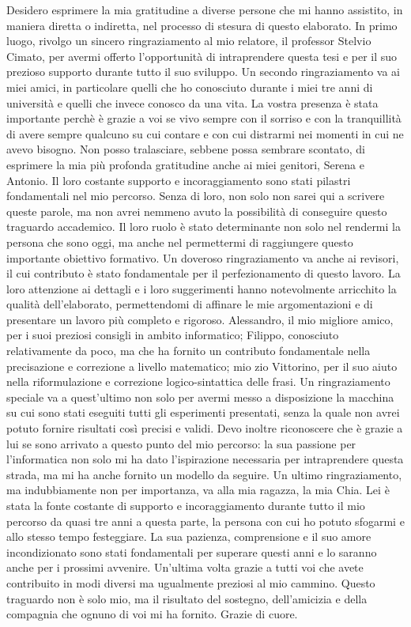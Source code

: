 Desidero esprimere la mia gratitudine a diverse persone che mi hanno assistito, in maniera
diretta o indiretta, nel processo di stesura di questo elaborato.  
In primo luogo, rivolgo un sincero ringraziamento al mio relatore, il professor 
Stelvio Cimato, per avermi offerto l'opportunità di intraprendere questa tesi e per 
il suo prezioso supporto durante tutto il suo sviluppo. Un secondo ringraziamento va ai 
miei amici, in particolare quelli che ho conosciuto durante i miei tre anni di università
e quelli che invece conosco da una vita. La vostra presenza è stata importante perchè è 
grazie a voi se vivo sempre con il sorriso e con la tranquillità di avere sempre qualcuno 
su cui contare e con cui distrarmi nei momenti in cui ne avevo bisogno. 
Non posso tralasciare, sebbene possa sembrare scontato, di esprimere la mia più profonda 
gratitudine anche ai miei genitori, Serena e Antonio. Il loro costante supporto e incoraggiamento sono stati 
pilastri fondamentali nel mio percorso. Senza di loro, non solo non sarei qui a 
scrivere queste parole, ma non avrei nemmeno avuto la possibilità di conseguire 
questo traguardo accademico. Il loro ruolo è stato determinante non solo nel rendermi 
la persona che sono oggi, ma anche nel permettermi di raggiungere questo importante 
obiettivo formativo.
Un doveroso ringraziamento va anche ai revisori, il cui contributo è stato fondamentale
per il perfezionamento di questo lavoro. La loro attenzione ai dettagli e
i loro suggerimenti hanno notevolmente arricchito la qualità
dell'elaborato, permettendomi di affinare le mie argomentazioni e di presentare un
lavoro più completo e rigoroso. Alessandro, il mio migliore amico, per i suoi preziosi 
consigli in ambito informatico; Filippo, conosciuto relativamente da poco, ma che ha 
fornito un contributo fondamentale nella precisazione e correzione a livello matematico; 
mio zio Vittorino, per il suo aiuto nella riformulazione e correzione logico-sintattica 
delle frasi. Un ringraziamento speciale va a quest'ultimo non solo per avermi messo a 
disposizione la macchina su cui sono stati eseguiti tutti gli esperimenti presentati, 
senza la quale non avrei potuto fornire risultati così precisi e validi.
Devo inoltre riconoscere che è grazie a lui se sono arrivato a questo punto del mio
percorso: la sua passione per l'informatica non solo mi ha dato l'ispirazione necessaria
per intraprendere questa strada, ma mi ha anche fornito un modello da seguire.
Un ultimo ringraziamento, ma indubbiamente non per importanza, va alla mia ragazza, la 
mia Chia. Lei è stata la fonte costante di supporto e incoraggiamento durante tutto il 
mio percorso da quasi tre anni a questa parte, la persona con cui ho potuto sfogarmi e allo stesso tempo 
festeggiare. La sua pazienza, comprensione e il suo amore incondizionato sono stati 
fondamentali per superare questi anni e lo saranno anche per i prossimi avvenire.  
Un'ultima volta grazie a tutti voi che avete contribuito in modi diversi ma ugualmente 
preziosi al mio cammino. Questo traguardo non è solo mio, ma il risultato del sostegno, 
dell'amicizia e della compagnia che ognuno di voi mi ha fornito. Grazie di cuore.